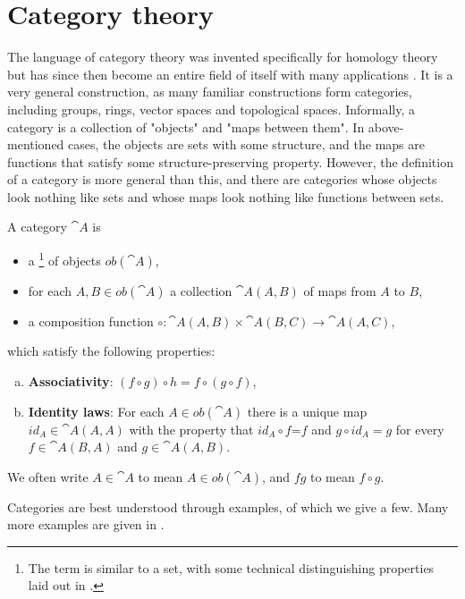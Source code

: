 \section{Category theory}\label{sec-category-theory}
The language of category theory was invented specifically for homology theory but has since then become an entire field of itself with many applications \cite{Marquis}. It is a very general construction, as many familiar constructions form categories, including groups, rings, vector spaces and topological spaces. Informally, a category is a collection of "objects" and "maps between them". In above-mentioned cases, the objects are sets with some structure, and the maps are functions that satisfy some structure-preserving property. However, the definition of a category is more general than this, and there are categories whose objects look nothing like sets and whose maps look nothing like functions between sets.

\begin{definition}
A category $\cat{A}$ is
\begin{itemize}
    \item a \footnote{The term  is similar to a set, with some technical distinguishing properties laid out in \cite{Leinster}.} of objects $ob(\cat{A})$,
    \item for each $A,B\in ob(\cat{A})$ a collection $\cat{A}(A,B)$ of maps from $A$ to $B$,
    \item a composition function $\circ:\cat{A}(A,B)\times \cat{A}(B,C)\rightarrow \cat{A}(A,C)$,
\end{itemize}
which satisfy the following properties:

\begin{enumerate}[(a)]
\item \textbf{Associativity}: $(f\circ g)\circ h=f\circ(g\circ f)$,
\item \textbf{Identity laws}: For each $A\in ob(\cat{A})$ there is a unique map $id_A\in \cat{A}(A,A)$ with the property that $id_A\circ f$=$f$ and $g\circ id_A=g$ for every $f\in \cat{A}(B,A)$ and $g\in \cat{A}(A,B)$.
\end{enumerate}
\end{definition}
We often write $A\in \cat{A}$ to mean $A\in ob(\cat{A})$, and $fg$ to mean $f\circ g$.
\par Categories are best understood through examples, of which we give a few. Many more examples are given in \cite{Leinster}.

